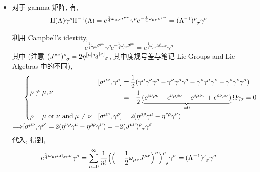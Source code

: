 \begin{itemize}
	\noindent\rule[0.5ex]{\linewidth}{0.5pt} %
	
	\item 对于 gamma 矩阵, 有,
	\begin{equation}
		\Pi(\Lambda) \gamma^\rho \Pi^{- 1}(\Lambda) = e^{\frac{1}{4} \omega_{\mu \nu} \sigma^{\mu \nu}} \gamma^\rho e^{- \frac{1}{4} \omega_{\mu \nu} \sigma^{\mu \nu}} = \tensor{(\Lambda^{- 1})}{^\rho_\sigma} \gamma^\sigma
	\end{equation}
	
	\begin{tcolorbox}[title=calculation:]
		利用 Campbell's identity,
		\begin{equation}
			e^{\frac{1}{4} \omega_{\mu \nu} \sigma^{\mu \nu}} \gamma^\rho e^{- \frac{1}{4} \omega_{\mu \nu} \sigma^{\mu \nu}} = e^{\frac{1}{4} \omega_{\mu \nu} \mathrm{ad}_{\sigma^{\mu \nu}}} \gamma^\rho
		\end{equation}
		其中 (注意 $\tensor{(J^{\mu \nu})}{^\rho_\sigma} = 2 \eta^{[\mu| \rho} \tensor{\delta}{^{|\nu]}_\sigma}$, 其中度规号差与笔记 \href{https://github.com/siyang03/my-note---Lie-Groups-and-Lie-Algebras}{Lie Groups and Lie Algebras} 中的不同),
			\begin{align}
			& \begin{dcases}
				\rho \neq \mu, \nu & \begin{aligned}
					[\sigma^{\mu \nu}, \gamma^\rho] &= \frac{1}{2} (\gamma^\mu \gamma^\nu \gamma^\rho - \gamma^\nu \gamma^\mu \gamma^\rho - \gamma^\rho \gamma^\mu \gamma^\nu + \gamma^\rho \gamma^\nu \gamma^\mu) \\
					&= - \frac{1}{2} \underbrace{(\epsilon^{\mu \nu \rho \sigma} - \epsilon^{\nu \mu \rho \sigma} - \epsilon^{\rho \mu \nu \sigma} + \epsilon^{\rho \nu \mu \sigma})}_{= 0} \Omega \gamma_\sigma = 0
				\end{aligned} \\
				\rho = \mu \ \text{or} \ \nu \ \text{and} \ \mu \neq \nu & [\sigma^{\mu \nu}, \gamma^\rho] = 2 (\eta^{\mu \rho} \gamma^\mu - \eta^{\nu \rho} \gamma^\nu)
			\end{dcases} \notag \\
			\Longrightarrow & [\sigma^{\mu \nu}, \gamma^\rho] = 2 (\eta^{\nu \rho} \gamma^\mu - \eta^{\mu \rho} \gamma^\nu) = - 2 \tensor{(J^{\mu \nu})}{^\rho_\sigma} \gamma^\sigma
		\end{align}
		代入, 得到,
		\begin{equation}
			e^{\frac{1}{4} \omega_{\mu \nu} \mathrm{ad}_{\sigma^{\mu \nu}}} \gamma^\rho = \sum_{n = 0}^\infty \frac{1}{n!} \tensor{\Big( \Big( - \frac{1}{2} \omega_{\mu \nu} J^{\mu \nu} \Big)^n \Big)}{^\rho_\sigma} \gamma^\sigma = \tensor{(\Lambda^{- 1})}{^\rho_\sigma} \gamma^\sigma
		\end{equation}
		

\end{tcolorbox}
\end{itemize}
